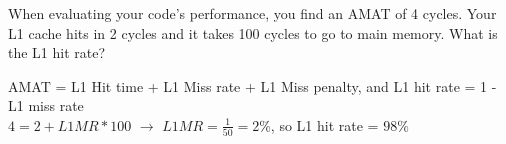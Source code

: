 \begin{blocksection}
\question
When evaluating your code’s performance, you find an AMAT of 4 cycles. Your L1 cache hits in 2 cycles and it takes 100 cycles to go to main memory. What is the L1 hit rate?

\begin{solution}[0.5in]
AMAT = L1 Hit time + L1 Miss rate + L1 Miss penalty, and L1 hit rate = 1 - L1 miss rate \\
$4 = 2 + L1MR * 100$ $\rightarrow$ $L1MR = \frac{1}{50} = 2\%$, so L1 hit rate = $98\%$

\end{solution}
\end{blocksection}